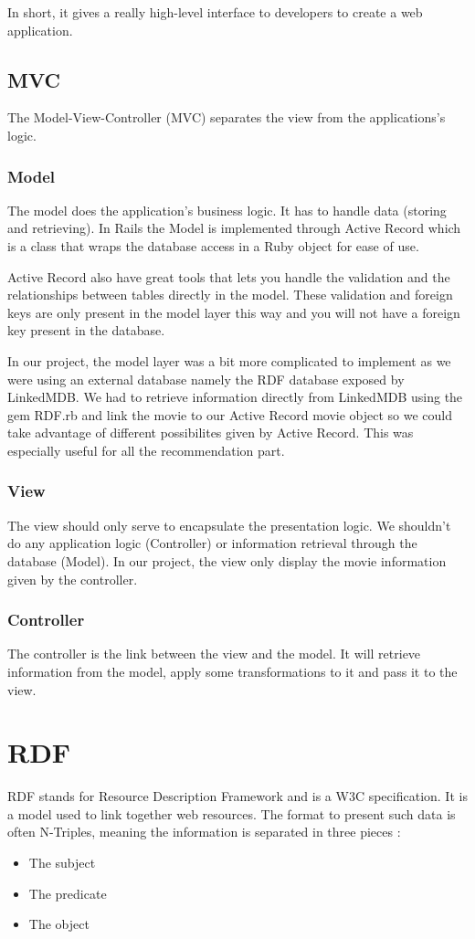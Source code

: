 \documentclass[12pt,a4paper]{article}
\begin{document}
In short, it gives a really high-level interface to developers to create a web application.
\subsection{MVC}
The Model-View-Controller (MVC) separates the view from the applications's logic.

\subsubsection{Model}
The model does the application's business logic. It has to handle data (storing and retrieving). In Rails the Model is implemented through Active Record which is a class that wraps the database access in a Ruby object for ease of use.

Active Record also have great tools that lets you handle the validation and the relationships between tables directly in the model. These validation and foreign keys are only present in the model layer this way and you will not have a foreign key present in the database.

In our project, the model layer was a bit more complicated to implement as we were using an external database namely the RDF database exposed by LinkedMDB. We had to retrieve information directly from LinkedMDB using the gem RDF.rb and link the movie to our Active Record movie object so we could take advantage of different possibilites given by Active Record. This was especially useful for all the recommendation part.

\subsubsection{View}
The view should only serve to encapsulate the presentation logic. We shouldn't do any application logic (Controller) or information retrieval through the database (Model). In our project, the view only display the movie information given by the controller.

\subsubsection{Controller}
The controller is the link between the view and the model. It will retrieve information from the model, apply some transformations to it and pass it to the view.

\section{RDF}
RDF stands for Resource Description Framework and is a W3C specification. It is a model used to link together web resources. The format to present such data is often N-Triples, meaning the information is separated in three pieces :
\begin{itemize}
\item The subject
\item The predicate
\item The object
\end{itemize}
\end{document}
